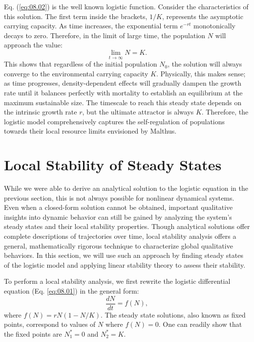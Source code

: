 Eq. (\ref{eq:08.02}) is the well known logistic function. Consider the characteristics of this solution. The first term inside the brackets, $1/K$, represents the asymptotic carrying capacity. As time increases, the exponential term $e^{-rt}$ monotonically decays to zero. Therefore, in the limit of large time, the population $N$ will approach the value:
\begin{equation*}
\lim_{t\to\infty} N = K.
\end{equation*}
This shows that regardless of the initial population $N_0$, the solution will always converge to the environmental carrying capacity $K$. Physically, this makes sense; as time progresses, density-dependent effects will gradually dampen the growth rate until it balances perfectly with mortality to establish an equilibrium at the maximum sustainable size. The timescale to reach this steady state depends on the intrinsic growth rate $r$, but the ultimate attractor is always $K$. Therefore, the logistic model comprehensively captures the self-regulation of populations towards their local resource limits envisioned by Malthus.

\section{Local Stability of Steady States}

While we were able to derive an analytical solution to the logistic equation in the previous section, this is not always possible for nonlinear dynamical systems. Even when a closed-form solution cannot be obtained, important qualitative insights into dynamic behavior can still be gained by analyzing the system's steady states and their local stability properties. Though analytical solutions offer complete descriptions of trajectories over time, local stability analysis offers a general, mathematically rigorous technique to characterize global qualitative behaviors. In this section, we will use such an approach by finding steady states of the logistic model and applying linear stability theory to assess their stability.

To perform a local stability analysis, we first rewrite the logistic differential equation (Eq. \ref{eq:08.01}) in the general form:
\begin{equation*}
\frac{dN}{dt} = f(N),
\end{equation*}
where $f(N)=rN(1-N/K)$. The steady state solutions, also known as fixed points, correspond to values of $N$ where $f(N)=0$. One can readily show that the fixed points are $N_1^*=0$ and $N_2^*=K$.

